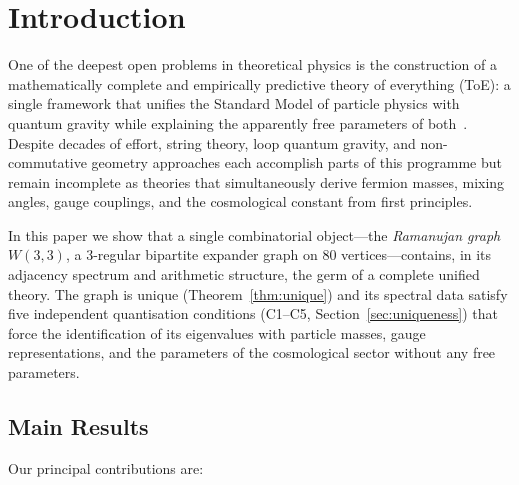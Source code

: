 
\section{Introduction}
\label{sec:intro}

One of the deepest open problems in theoretical physics is the construction
of a mathematically complete and empirically predictive theory of everything
(ToE): a single framework that unifies the Standard Model of particle physics
with quantum gravity while explaining the apparently free parameters of
both~\cite{Weinberg1995,Polchinski1998}.  Despite decades of effort, string
theory, loop quantum gravity, and non-commutative geometry approaches each
accomplish parts of this programme but remain incomplete as theories that
simultaneously derive fermion masses, mixing angles, gauge couplings, and the
cosmological constant from first principles.

In this paper we show that a single combinatorial object—the
\emph{Ramanujan graph} $W(3,3)$, a 3-regular bipartite expander graph on
80 vertices—contains, in its adjacency spectrum and arithmetic structure,
the germ of a complete unified theory.  The graph is unique (Theorem~\ref{thm:unique})
and its spectral data satisfy five independent quantisation conditions
(C1--C5, Section~\ref{sec:uniqueness}) that force the identification of its
eigenvalues with particle masses, gauge representations, and the parameters
of the cosmological sector without any free parameters.

\subsection*{Main Results}

Our principal contributions are:


